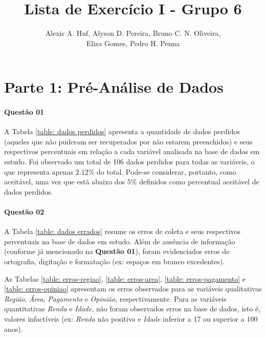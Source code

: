 \documentclass[10pt,a4paper,oneside]{article}
\author{%
	Alexis A. Huf, %
	Alyson D. Pereira, %
	Bruno C. N. Oliveira,\\%
	Eliza Gomes, %
	Pedro H. Penna
	}
\title{Lista de Exercício I - Grupo 6}
\begin{document}
\maketitle

\section*{Parte 1: Pré-Análise de Dados}

\paragraph{Questão 01}

A Tabela \ref{table: dados perdidos} apresenta a quantidade de dados perdidos (aqueles que não puderam ser recuperados por não estarem preenchidos) e seus respectivos percentuais em relação a cada variável analisada na base de dados em estudo. Foi observado um total de 106 dados perdidos para todas as variáveis, o que representa apenas $2.12\%$ do total. Pode-se considerar, portanto, como aceitável, uma vez que está abaixo dos $5\%$ definidos como percentual aceitável de dados perdidos.



%
%
\paragraph{Questão 02}

A Tabela \ref{table: dados errados} resume os erros de coleta e seus respectivos percentuais na base de dados em estudo. Além de ausência de informação (conforme já mencionado na \textbf{Questão 01}), foram evidenciados erros de ortografia, digitação e formatação (ex: espaços em branco excedentes). 

As Tabelas \ref{table: erros-regiao}, \ref{table: erros-area}, \ref{table: erros-pagamento} e \ref{table: erros-opiniao} apresentam os erros observados para as variáveis qualitativas \textit{Região}, \textit{Área}, \textit{Pagamento} e \textit{Opinião}, respectivamente.
Para as variáveis quantitativas \textit{Renda} e \textit{Idade}, não foram observados erros na base de dados, isto é, valores infactíveis (ex: \textit{Renda} não positiva e \textit{Idade} inferior a 17 ou superior a 100 anos).
\end{document}
